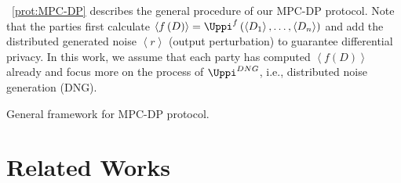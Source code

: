 ~\autoref{prot:MPC-DP} describes the general procedure of our MPC-DP protocol. Note that the parties first calculate $\left\langle f\left(D\right)\right\rangle =\Uppi^{f }\left(\left\langle D_1 \right\rangle ,\ldots,\left\langle D_n \right\rangle\right) $ and add the distributed generated noise $\left\langle r\right\rangle$ (output perturbation) to guarantee differential privacy. In this work, we assume that each party has computed $\left\langle f\left(D\right) \right\rangle$ already and focus more on the process of $\Uppi^{DNG }$, i.e., distributed noise generation (DNG).

\begin{protocol}[tbh!]
	\centering
	\caption{General framework for MPC-DP protocol.}
	\label{prot:MPC-DP}
\end{protocol}
\FloatBarrier



\section{Related Works}


